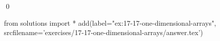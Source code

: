 
\begin{ex}
  \label{ex:17-17-one-dimensional-arrays}
  
  \qed
\end{ex}
\begin{python0}
from solutions import *
add(label="ex:17-17-one-dimensional-arrays",
    srcfilename='exercises/17-17-one-dimensional-arrays/answer.tex')
\end{python0}
